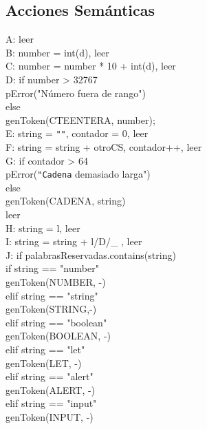\documentclass[11pt, , a4paper, titlepage]{article}
\begin{document}
\subsection{Acciones Semánticas}
\begin{flushleft}
    A: leer\\
    B: number = int(d), leer\\
    C: number = number * 10 + int(d), leer\\
    D: if number >\hspace{1mm} 32767\\
    \qquad pError("Número fuera de rango")\\
    \quad else \\
    \qquad genToken(CTEENTERA, number);\\
    E: string = \verb|""|, contador = 0, leer\\
    F: string = string + otroCS, contador++, leer\\
    G: if contador >\hspace{1mm} 64\\
    \qquad pError(\verb|"Cadena| demasiado larga")\\
    \quad else\\
    \qquad genToken(CADENA, string)\\
    \quad leer\\
    H: string = l, leer\\
    I: string = string + l/D/\_ , leer\\
    J: if palabrasReservadas.contains(string)\\
    \qquad if string == "number"\\
    \qquad \quad      genToken(NUMBER, -)\\
    \qquad elif string == "string"\\
    \qquad \quad     genToken(STRING,-)\\
    \qquad  elif string == "boolean"\\
    \qquad \quad      genToken(BOOLEAN, -)\\
    \qquad    elif string == "let"\\
    \qquad \quad      genToken(LET, -)\\
    \qquad    elif string == "\phantom{}alert"\\
    \qquad \quad      genToken(ALERT, -)\\
    \qquad    elif string == "\phantom{}input"\\
    \qquad \quad      genToken(INPUT, -)\\

\end{flushleft}
\end{document}
